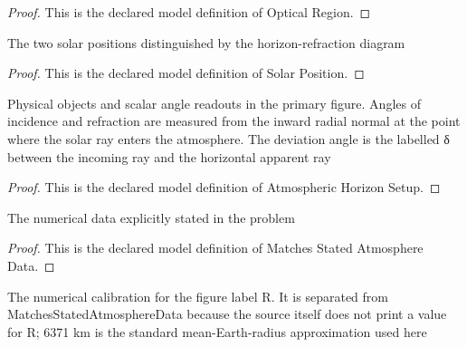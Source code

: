 \begin{proof}
  This is the declared model definition of Optical Region.
\end{proof}
\begin{definition}
  \label{def:physics:phyx-mini-0101:phyxminiproblems-problemphyxmini0101-solarposition}
  The two solar positions distinguished by the horizon-refraction diagram
\end{definition}
\begin{proof}
  This is the declared model definition of Solar Position.
\end{proof}
\begin{definition}
  \label{def:physics:phyx-mini-0101:phyxminiproblems-problemphyxmini0101-atmospherichorizonsetup}
  Physical objects and scalar angle readouts in the primary figure. Angles of incidence and refraction are measured from the inward radial normal at the point where the solar ray enters the atmosphere. The deviation angle is the labelled δ between the incoming ray and the horizontal apparent ray
\end{definition}
\begin{proof}
  This is the declared model definition of Atmospheric Horizon Setup.
\end{proof}
\begin{definition}
  \label{def:physics:phyx-mini-0101:phyxminiproblems-problemphyxmini0101-matchesstatedatmospheredata}
  The numerical data explicitly stated in the problem
\end{definition}
\begin{proof}
  This is the declared model definition of Matches Stated Atmosphere Data.
\end{proof}
\begin{definition}
  \label{def:physics:phyx-mini-0101:phyxminiproblems-problemphyxmini0101-usesmeanearthradiuscalibration}
  The numerical calibration for the figure label R. It is separated from MatchesStatedAtmosphereData because the source itself does not print a value for R; 6371 km is the standard mean-Earth-radius approximation used here
\end{definition}
